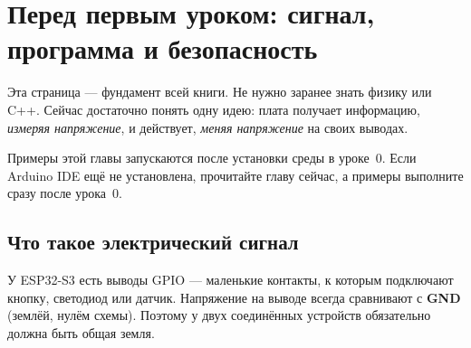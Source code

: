 \section*{Перед первым уроком: сигнал, программа и безопасность}
\renewcommand{\thelisting}{В.\arabic{listing}}

Эта страница --- фундамент всей книги. Не нужно заранее знать физику или C++. Сейчас достаточно
понять одну идею: плата получает информацию, \emph{измеряя напряжение}, и действует, \emph{меняя
напряжение} на своих выводах.

\begin{tip}
Примеры этой главы запускаются после установки среды в уроке~0. Если Arduino IDE ещё не
установлена, прочитайте главу сейчас, а примеры выполните сразу после урока~0.
\end{tip}

\subsection*{Что такое электрический сигнал}

У ESP32-S3 есть выводы GPIO --- маленькие контакты, к которым подключают кнопку, светодиод или датчик.
Напряжение на выводе всегда сравнивают с \textbf{GND} (землёй, нулём схемы). Поэтому у двух
соединённых устройств обязательно должна быть общая земля.

\begin{center}
\end{center}


